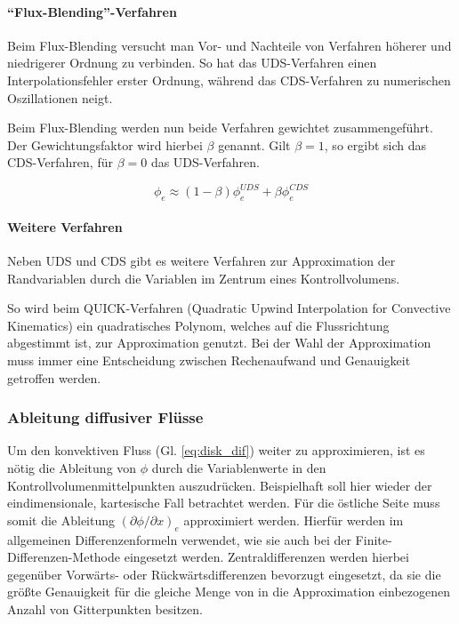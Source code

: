 \paragraph{``Flux-Blending''-Verfahren}
\noindent
Beim Flux-Blending versucht man Vor- und Nachteile von Verfahren höherer und niedrigerer
Ordnung zu verbinden. So hat das UDS-Verfahren einen Interpolationsfehler erster Ordnung,
während das CDS-Verfahren zu numerischen Oszillationen neigt.

Beim Flux-Blending werden nun beide Verfahren gewichtet zusammengeführt. Der Gewichtungsfaktor
wird hierbei $\beta$ genannt. Gilt $\beta = 1$, so ergibt sich das CDS-Verfahren, für
$\beta = 0$ das UDS-Verfahren.

\begin{equation}
  \phi_e \approx (1-\beta)\phi_e^{UDS} + \beta \phi_e^{CDS}
  \label{eq:flux_blending}
\end{equation}



\paragraph{Weitere Verfahren}
\noindent Neben UDS und CDS gibt es weitere Verfahren zur Approximation der Randvariablen durch
die Variablen im Zentrum eines Kontrollvolumens.

So wird beim QUICK-Verfahren (Quadratic Upwind Interpolation for Convective
Kinematics) ein quadratisches Polynom, welches auf die Flussrichtung abgestimmt ist,
zur Approximation genutzt. Bei der Wahl der Approximation muss immer eine Entscheidung
zwischen Rechenaufwand und Genauigkeit getroffen werden.



\subsubsection{Ableitung diffusiver Flüsse}
\label{sec:dif_fluss}

Um den konvektiven Fluss (Gl. \ref{eq:disk_dif}) weiter zu approximieren, ist es nötig die Ableitung von
$\phi$ durch die Variablenwerte in den Kontrollvolumenmittelpunkten auszudrücken.
Beispielhaft soll hier wieder der eindimensionale, kartesische Fall betrachtet werden.
Für die östliche Seite muss somit die Ableitung $(\partial \phi /\partial x)_e$ approximiert werden.
Hierfür werden im allgemeinen Differenzenformeln verwendet, wie sie auch bei der
Finite-Differenzen-Methode eingesetzt werden. Zentraldifferenzen werden hierbei
gegenüber Vorwärts- oder Rückwärtsdifferenzen bevorzugt eingesetzt, da sie die größte
Genauigkeit für die gleiche Menge von in die Approximation einbezogenen Anzahl von Gitterpunkten
besitzen.

